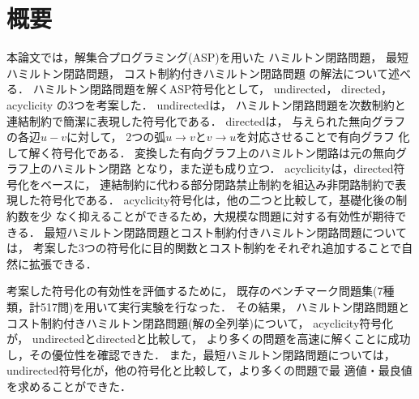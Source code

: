 \chapter*{概要}



本論文では，解集合プログラミング(ASP)を用いた
ハミルトン閉路問題，
最短ハミルトン閉路問題，
コスト制約付きハミルトン閉路問題
の解法について述べる．
%
ハミルトン閉路問題を解くASP符号化として，
\textsf{undirected}，
\textsf{directed}，
\textsf{acyclicity}
の3つを考案した．
\textsf{undirected}は，
ハミルトン閉路問題を次数制約と連結制約で簡潔に表現した符号化である．
\textsf{directed}は，
与えられた無向グラフの各辺$u-v$に対して，
2つの弧$u\rightarrow v$と$v\rightarrow u$を対応させることで有向グラフ
化して解く符号化である．
変換した有向グラフ上のハミルトン閉路は元の無向グラフ上のハミルトン閉路
となり，また逆も成り立つ．
\textsf{acyclicity}は，\textsf{directed}符号化をベースに，
連結制約に代わる部分閉路禁止制約を組込み非閉路制約で表現した符号化である．
\textsf{acyclicity}符号化は，他の二つと比較して，基礎化後の制約数を少
なく抑えることができるため，大規模な問題に対する有効性が期待できる．
最短ハミルトン閉路問題とコスト制約付きハミルトン閉路問題については，
考案した3つの符号化に目的関数とコスト制約をそれぞれ追加することで自然に拡張できる．

考案した符号化の有効性を評価するために，
既存のベンチマーク問題集(7種類，計517問)を用いて実行実験を行なった．
その結果，
ハミルトン閉路問題とコスト制約付きハミルトン閉路問題(解の全列挙)について，
\textsf{acyclicity}符号化が，
\textsf{undirected}と\textsf{directed}と比較して，
より多くの問題を高速に解くことに成功し，その優位性を確認できた．
また，最短ハミルトン閉路問題については，
\textsf{undirected}符号化が，他の符号化と比較して，より多くの問題で最
適値・最良値を求めることができた．



